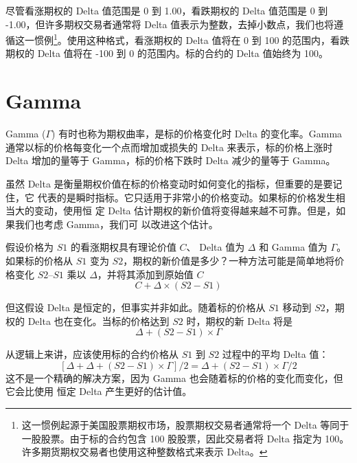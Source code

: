 
尽管看涨期权的 Delta 值范围是 0 到 1.00，看跌期权的 Delta 值范围是 0 到 -1.00，但许多期权交易者通常将 Delta 值表示为整数，去掉小数点，我们也将遵循这一惯例\footnote{这一惯例起源于美国股票期权市场，股票期权交易者通常将一个 Delta 等同于一股股票。由于标的合约包含 100 股股票，因此交易者将 Delta 指定为 100。许多期货期权交易者也使用这种整数格式来表示 Delta。}。使用这种格式，看涨期权的 Delta 值将在 0 到 100 的范围内，看跌期权的 Delta 值将在 -100 到 0 的范围内。标的合约的 Delta 值始终为 100。

\section{Gamma}
Gamma ($\Gamma$) 有时也称为期权曲率，是标的价格变化时 Delta 的变化率。Gamma 通常以标的价格每变化一个点而增加或损失的 Delta 来表示，标的价格上涨时 Delta 增加的量等于 Gamma，标的价格下跌时 Delta 减少的量等于 Gamma。


虽然 Delta 是衡量期权价值在标的价格变动时如何变化的指标，但重要的是要记住，它
代表的是瞬时指标。它只适用于非常小的价格变动。如果标的价格发生相当大的变动，使用恒
定 Delta 估计期权的新价值将变得越来越不可靠。但是，如果我们也考虑 Gamma，我们可
以改进这个估计。

假设价格为 $S1$ 的看涨期权具有理论价值 $C$、 Delta 值为 $\Delta$ 和 Gamma 值为 $\Gamma$。如果标的价格从 $S1$ 变为 $S2$，期权的新价值是多少？一种方法可能是简单地将价格变化 $S2 – S1$ 乘以 $\Delta$，并将其添加到原始值 $C$
$$C+\Delta \times (S2-S1)$$

但这假设 Delta 是恒定的，但事实并非如此。随着标的价格从 $S1$ 移动到 $S2$，期权的 Delta 也在变化。当标的价格达到 $S2$ 时，期权的新 Delta 将是
$$\Delta +(S2-S1)\times \Gamma$$

从逻辑上来讲，应该使用标的合约价格从 $S1$ 到 $S2$ 过程中的平均 Delta 值：
$$[\Delta+\Delta+(S2-S1)\times \Gamma]/2=\Delta+(S2-S1)\times\Gamma/2$$
这不是一个精确的解决方案，因为 Gamma 也会随着标的价格的变化而变化，但它会比使用
恒定 Delta 产生更好的估计值。